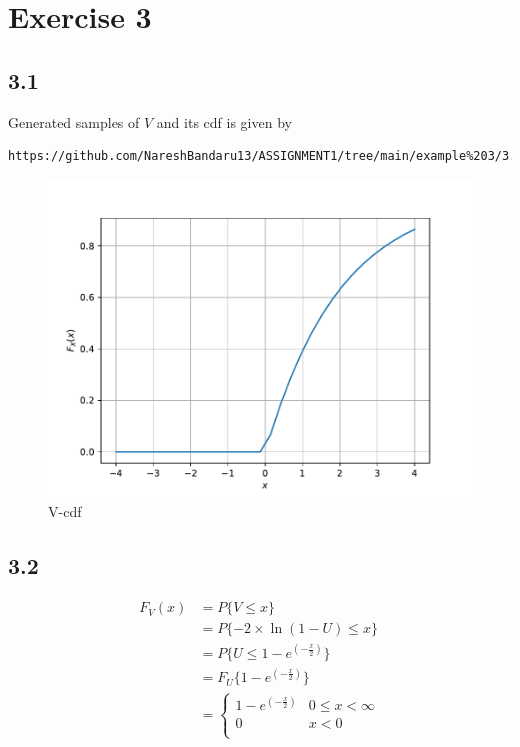 \documentclass[journal,12pt,twocolumn]{IEEEtran}
\begin{document}
\section*{Exercise 3}
\subsection*{3.1}
Generated samples of $V$ and its cdf is given by
\begin{lstlisting}
https://github.com/NareshBandaru13/ASSIGNMENT1/tree/main/example%203/3.1
\end{lstlisting}
\begin{figure}[H]
    \centering
    \includegraphics[scale=0.5]{figures/V_cdf.pdf}  
    \caption{V-cdf}
    \label{fig:my_label3}
\end{figure}



\subsection*{3.2}
\begin{align*}
    F_V (x) &= P\{V \le x\} \\
            &= P\{-2\times \ln{(1-U)} \le x\} \\
            &= P\{U \le 1 - e^{(-\frac{x}{2})}\} \\ 
            &= F_U\{1- e^{(-\frac{x}{2})} \}\\
            &=
\begin{cases}
 1 - e^{(-\frac{x}{2})} & 0 \le x < \infty \\
 0  & x<0 \\
 \end{cases}
\end{align*} 
\end{document}
